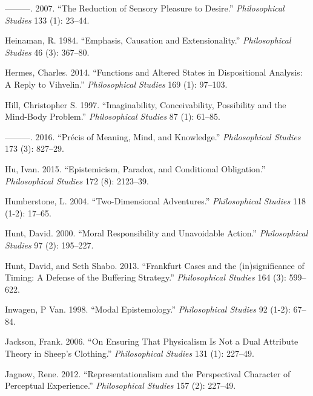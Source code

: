 \documentclass[
  10pt,
  letterpaper,
  DIV=11,
  numbers=noendperiod,
  twoside]{scrartcl}
\newlength{\cslhangindent}
\newenvironment{CSLReferences}[2] %
 {\begin{list}{}{%
  \setlength{\itemindent}{0pt}
  \setlength{\leftmargin}{0pt}
  \setlength{\parsep}{0pt}
  \ifodd #1
   \setlength{\leftmargin}{\cslhangindent}
   \setlength{\itemindent}{-1\cslhangindent}
  \fi
  \setlength{\itemsep}{#2\baselineskip}}}
 {\end{list}}
\begin{document}
\begin{CSLReferences}{1}{0}
---------. 2007. {``The Reduction of Sensory Pleasure to Desire.''}
\emph{Philosophical Studies} 133 (1): 23--44.

Heinaman, R. 1984. {``Emphasis, Causation and Extensionality.''}
\emph{Philosophical Studies} 46 (3): 367--80.

Hermes, Charles. 2014. {``Functions and Altered States in Dispositional
Analysis: A Reply to Vihvelin.''} \emph{Philosophical Studies} 169 (1):
97--103.

Hill, Christopher S. 1997. {``Imaginability, Conceivability, Possibility
and the Mind-Body Problem.''} \emph{Philosophical Studies} 87 (1):
61--85.

---------. 2016. {``Précis of Meaning, Mind, and Knowledge.''}
\emph{Philosophical Studies} 173 (3): 827--29.

Hu, Ivan. 2015. {``Epistemicism, Paradox, and Conditional Obligation.''}
\emph{Philosophical Studies} 172 (8): 2123--39.

Humberstone, L. 2004. {``Two-Dimensional Adventures.''}
\emph{Philosophical Studies} 118 (1-2): 17--65.

Hunt, David. 2000. {``Moral Responsibility and Unavoidable Action.''}
\emph{Philosophical Studies} 97 (2): 195--227.

Hunt, David, and Seth Shabo. 2013. {``Frankfurt Cases and the
(in)significance of Timing: A Defense of the Buffering Strategy.''}
\emph{Philosophical Studies} 164 (3): 599--622.

Inwagen, P Van. 1998. {``Modal Epistemology.''} \emph{Philosophical
Studies} 92 (1-2): 67--84.

Jackson, Frank. 2006. {``On Ensuring That Physicalism Is Not a Dual
Attribute Theory in Sheep's Clothing.''} \emph{Philosophical Studies}
131 (1): 227--49.

Jagnow, Rene. 2012. {``Representationalism and the Perspectival
Character of Perceptual Experience.''} \emph{Philosophical Studies} 157
(2): 227--49.


\end{CSLReferences}
\end{document}
